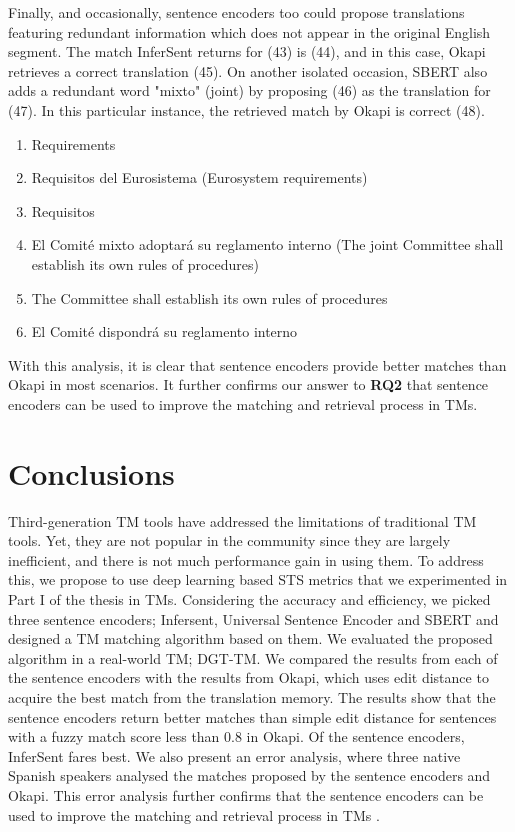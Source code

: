 Finally, and occasionally, sentence encoders too could propose translations featuring redundant information which does not appear in the original English segment. The match InferSent returns for (43) is (44), and in this case, Okapi retrieves a correct translation (45). On another isolated occasion, SBERT also adds a redundant word "mixto" (joint) by proposing (46) as the translation for (47). In this particular instance, the retrieved match by Okapi is correct (48). 

\begin{enumerate}[resume,label={(\arabic*)}]
\item	Requirements
\item	Requisitos del Eurosistema (Eurosystem requirements)
\item	Requisitos
\item	El Comité mixto adoptará su reglamento interno (The joint Committee shall establish its own rules of procedures)
\item	The Committee shall establish its own rules of procedures
\item	El Comité dispondrá su reglamento interno
\end{enumerate}

With this analysis, it is clear that sentence encoders provide better matches than Okapi in most scenarios. It further confirms our answer to \textbf{RQ2} that sentence encoders can be used to improve the matching and retrieval process in TMs.

\section{Conclusions}
Third-generation TM tools have addressed the limitations of traditional TM tools. Yet, they are not popular in the community since they are largely inefficient, and there is not much performance gain in using them. To address this, we propose to use deep learning based STS metrics that we experimented in Part I of the thesis in TMs. Considering the accuracy and efficiency, we picked three sentence encoders; Infersent, Universal Sentence Encoder and SBERT and designed a TM matching algorithm based on them. We evaluated the proposed algorithm in a real-world TM; DGT-TM. We compared the results from each of the sentence encoders with the results from Okapi, which uses edit distance to acquire the best match from the translation memory.  The results show that the sentence encoders return better matches than simple edit distance for sentences with a fuzzy match score less than 0.8 in Okapi. Of the sentence encoders, InferSent fares best. We also present an error analysis, where three native Spanish speakers analysed the matches proposed by the sentence encoders and Okapi. This error analysis further confirms that the sentence encoders can be used to improve the matching and retrieval process in TMs \autocite{ranasinghe-etal-2020-intelligent}. 

